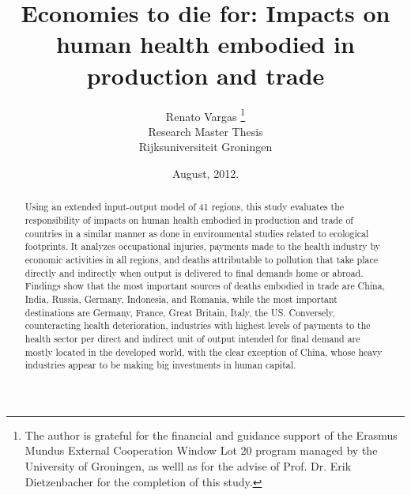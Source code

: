 \documentclass[a4paper,12pt, ]{article}
\begin{document}
 



\title{Economies to die for: Impacts on human health embodied in production and trade} 
\author{Renato Vargas
\thanks{The author is grateful for the financial and guidance support of the Erasmus Mundus External Cooperation Window Lot 20 program managed by the University of Groningen, as welll as for the advise of Prof. Dr. Erik Dietzenbacher for the completion of this study.} 
\\Research Master Thesis
\\Rijksuniversiteit Groningen} 
\date{August, 2012.} 

\maketitle

\begin{abstract} 
Using an extended input-output model of 41 regions, this study evaluates the responsibility of impacts on human health embodied in production and trade of countries in a similar manner as done in environmental studies related to ecological footprints. It analyzes occupational injuries, payments made to the health industry by economic activities in all regions, and deaths attributable to pollution that take place directly and indirectly when output is delivered to final demands home or abroad. Findings show that the most important sources of deaths embodied in trade are China, India, Russia, Germany, Indonesia, and Romania, while the most important destinations are Germany, France, Great Britain, Italy, the US. Conversely, counteracting health deterioration, industries with highest levels of payments to the health sector per direct and indirect unit of output intended for final demand are mostly located in the developed world, with the clear exception of China, whose heavy industries appear to be making big investments in human capital.

\end{abstract}
\end{document}
